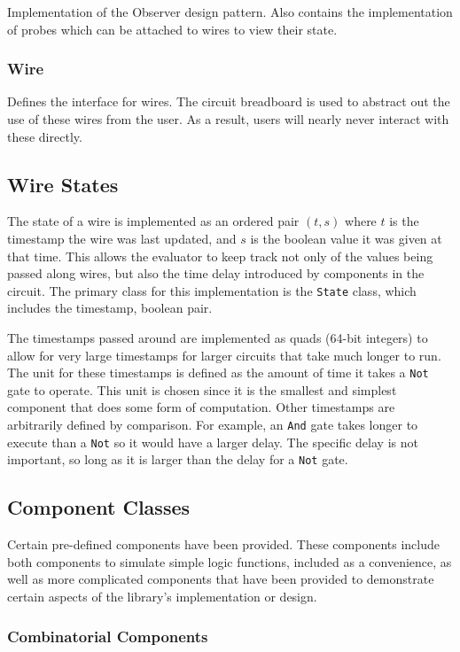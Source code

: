 \documentclass{article}
\newcommand{\ClassName}[1]{\texttt{#1}}
\begin{document}
Implementation of the Observer design pattern. Also contains the implementation of probes which can be attached to wires to view their state.

\subsubsection{Wire}

Defines the interface for wires. The circuit breadboard is used to abstract out the use of these wires from the user. As a result, users will nearly never interact with these directly.

\subsection{Wire States}

The state of a wire is implemented as an ordered pair $(t,s)$ where $t$ is the timestamp the wire was last updated, and $s$ is the boolean value it was given at that time. This allows the evaluator to keep track not only of the values being passed along wires, but also the time delay introduced by components in the circuit. The primary class for this implementation is the \ClassName{State} class, which includes the timestamp, boolean pair.

The timestamps passed around are implemented as quads (64-bit integers) to allow for very large timestamps for larger circuits that take much longer to run. The unit for these timestamps is defined as the amount of time it takes a \ClassName{Not} gate to operate. This unit is chosen since it is the smallest and simplest component that does some form of computation. Other timestamps are arbitrarily defined by comparison. For example, an \ClassName{And} gate takes longer to execute than a \ClassName{Not} so it would have a larger delay. The specific delay is not important, so long as it is larger than the delay for a \ClassName{Not} gate.

\subsection{Component Classes}

Certain pre-defined components have been provided. These components include both components to simulate simple logic functions, included as a convenience, as well as more complicated components that have been provided to demonstrate certain aspects of the library's implementation or design.

\subsubsection{Combinatorial Components}
\end{document}
